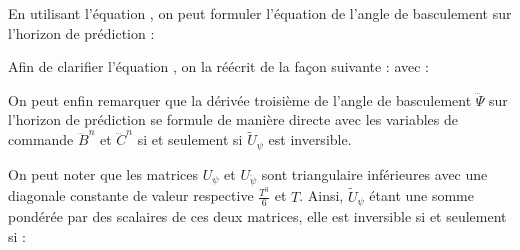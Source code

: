 					En utilisant l'équation , on peut formuler l'équation de l'angle de basculement sur l'horizon de prédiction :
					
					Afin de clarifier l'équation , on la réécrit de la façon suivante :
					avec :
				
					
					On peut enfin remarquer que la dérivée troisième de l'angle de basculement $\dddot\Psi$ sur l'horizon de prédiction se formule de manière directe avec les variables de commande $\dddot{B}^n$ et $\dddot{C}^n$
					si et seulement si $\tilde{U}_\psi$ est inversible.
				
					On peut noter que les matrices $U_\psi$ et $U_{\ddot{\psi}}$ sont triangulaire inférieures avec une diagonale constante de valeur respective $\frac{T^3}{6}$ et $T$.
					Ainsi, $\tilde{U}_\psi$ étant une somme pondérée par des scalaires de ces deux matrices, elle est inversible si et seulement si :
					
